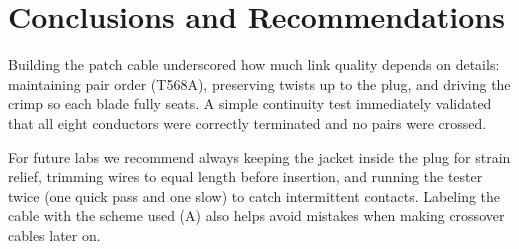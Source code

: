 \section*{Conclusions and Recommendations}

Building the patch cable underscored how much link quality depends on details:
maintaining pair order (T568A), preserving twists up to the plug, and driving
the crimp so each blade fully seats. A simple continuity test immediately
validated that all eight conductors were correctly terminated and no pairs were
crossed.

For future labs we recommend always keeping the jacket inside the plug for
strain relief, trimming wires to equal length before insertion, and running the
tester twice (one quick pass and one slow) to catch intermittent contacts.
Labeling the cable with the scheme used (A) also helps avoid mistakes when
making crossover cables later on.
